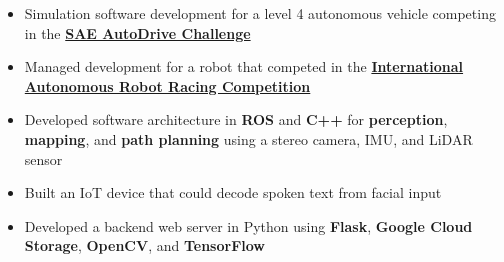 

\begin{itemize}
\item Simulation software development for a level 4 autonomous vehicle competing in the \href{https://www.sae.org/attend/student-events/autodrive-challenge/}{\textbf{SAE AutoDrive Challenge}}
\end{itemize}
\divider

\begin{itemize}
\item Managed development for a robot that competed in the \href{https://iarrc.org/}{\textbf{International Autonomous Robot Racing Competition}} 
\item Developed software architecture in \textbf{ROS} and \textbf{C++} for \textbf{perception}, \textbf{mapping}, and \textbf{path planning} using a stereo camera, IMU, and LiDAR sensor
\end{itemize}


\begin{itemize}
\item Built an IoT device that could decode spoken text from facial input
\item Developed a backend web server in Python using \textbf{Flask}, \textbf{Google Cloud Storage}, \textbf{OpenCV}, and \textbf{TensorFlow}
\end{itemize}
\divider

